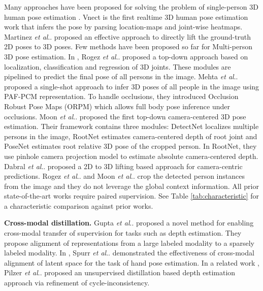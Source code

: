 \documentclass[runningheads]{llncs}
\makeatletter
\DeclareRobustCommand\onedot{\futurelet\@let@token\@onedot}
\def\@onedot{\ifx\@let@token.\else.\null\fi\xspace}
\def\etal{\emph{et al}\onedot}
\makeatother
\begin{document}
Many approaches have been proposed for solving the problem of  single-person 3D human pose estimation \cite{sun2017compositional,kundu2020self,kundu2020unsupervised,kundu2020kinematic,pavlakos2017coarse,yasin2016dual}. Vnect \cite{mehta2017vnect} is the first realtime 3D human pose estimation work that infers the pose by parsing location-maps and joint-wise heatmaps. Martinez \etal \cite{martinez2017simple} proposed an effective approach to directly lift the ground-truth 2D poses to 3D poses. 
Few methods have been proposed so far for Multi-person 3D pose estimation. In  \cite{rogez2017lcr,rogez2019lcr}, Rogez \etal proposed a top-down approach based on localization, classification and regression of 3D joints. These modules are pipelined to predict the final pose of all persons in the image. Mehta \etal \cite{mehta2018single} proposed a single-shot approach to infer 3D poses of all people in the image using PAF-PCM representation. To handle occlusions, they introduced Occlusion Robust Pose Maps (ORPM) which allows full body pose inference under occlusions. Moon \etal \cite{moon2019camera} proposed the first top-down camera-centered 3D pose estimation. Their framework contains three modules: DetectNet localizes multiple persons in the image, RootNet estimates camera-centered depth of root joint and PoseNet estimates root relative 3D pose of the cropped person. In RootNet, they use pinhole camera projection model to estimate absolute camera-centered depth. Dabral \etal \cite{Dabral2019MultiPerson3H} proposed a 2D to 3D lifting based approach for camera-centric predictions.  
Rogez \etal \cite{rogez2017lcr,rogez2019lcr} and Moon \etal \cite{moon2019camera} crop the detected person instances from the image and they do not leverage the global context information. 
All prior state-of-the-art works \cite{rogez2017lcr,rogez2019lcr,mehta2018single,Dabral2019MultiPerson3H,moon2019camera} require paired supervision. See Table \ref{tab:characteristic} for a characteristic comparison against prior works.

\noindent \textbf{Cross-modal distillation.} Gupta \etal \cite{gupta2016cross} proposed a novel method for enabling cross-modal transfer of supervision for tasks such as depth estimation. They propose alignment of representations from a large labeled modality to a sparsely labeled modality. In \cite{spurr2018cross}, Spurr \etal demonstrated the effectiveness of cross-modal alignment of latent space for the task of hand pose estimation. In a related work \cite{pilzer2019refine}, Pilzer \etal proposed an unsupervised distillation based depth estimation approach via refinement of cycle-inconsistency. 
\end{document}
